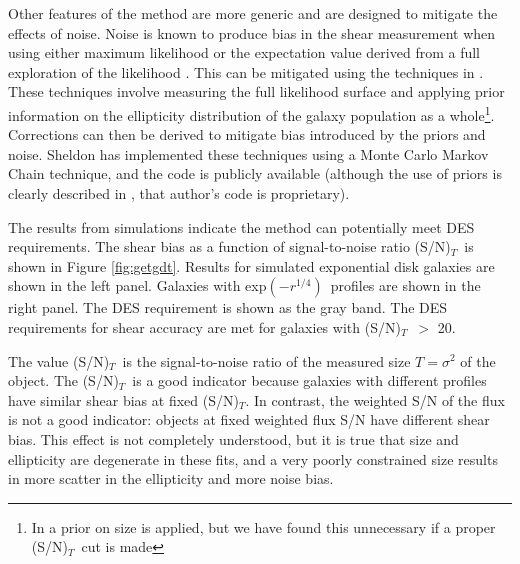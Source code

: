\documentclass[12pt]{article}
\newcommand{\devprof}{exp$(-r^{1/4})$}
\newcommand{\sncut}{20}
\newcommand{\snsize}{(S/N)$_{T}$}
\begin{document}
Other features of the method are more generic and are designed to mitigate the
effects of noise.  Noise is known to produce bias in the shear measurement when
using either maximum likelihood \cite{Refreg12} or the expectation value
derived from a full exploration of the likelihood \cite{Miller12}.  This can be
mitigated using the techniques in \cite{Miller07,Miller12}. These techniques
involve measuring the full likelihood surface and applying prior information on
the ellipticity distribution of the galaxy population as a whole\footnote{In
\cite{Miller12} a prior on size is applied, but we have found this unnecessary
if a proper \snsize\ cut is made}.
Corrections can then be derived to mitigate bias introduced by the priors and
noise.  Sheldon has implemented these techniques using a Monte Carlo Markov
Chain technique, and the code is publicly available (although the use of priors
is clearly described in \cite{Miller07}, that author's code is proprietary).

The results from simulations indicate the method can potentially meet DES
requirements.  The shear bias as a function of signal-to-noise ratio \snsize\
is shown in Figure \ref{fig:getgdt}.  Results for simulated exponential disk galaxies
are shown in the left panel.  Galaxies with \devprof\ profiles are shown in the
right panel.  The DES requirement is shown as the gray band.  The DES
requirements for shear accuracy are met for galaxies with \snsize\ $>$
\sncut.  

The value \snsize\ is the signal-to-noise ratio of the measured size
$T=\sigma^2$ of the object.  The \snsize\ is a good indicator because galaxies
with different profiles have similar shear bias at fixed \snsize.  In contrast,
the weighted S/N of the flux is not a good indicator: objects at fixed weighted
flux S/N have different shear bias.  This effect is not completely understood,
but it is true that size and ellipticity are degenerate in these fits, and a
very poorly constrained size results in more scatter in the ellipticity and
more noise bias.
\end{document}
